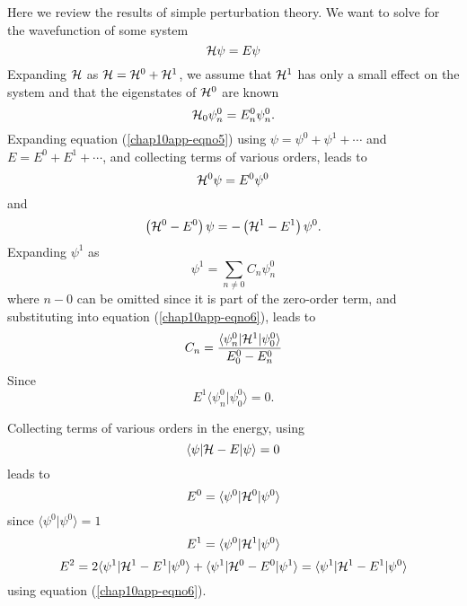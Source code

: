Here we review the results of simple perturbation theory.  We 
want to solve for the wavefunction of some system
\begin{equation}
{\cal H} \psi = E \psi
\label{chap10app-eqno5}
\end{equation}
Expanding ${\cal H}$ as ${\cal H} = {\cal H}^0 + {\cal H}^1$, 
we assume that ${\cal H}^1$ has only a small effect on the system and that the
eigenstates of ${\cal H}^0$ are known
\begin{equation}
{\cal H}_0 \psi^0_n = E^0_n \psi^0_n .
\end{equation}
Expanding equation (\ref{chap10app-eqno5}) using $\psi = \psi^0 +
\psi^1 + \cdots$ and $E = E^0 + E^1 + \cdots$, and collecting terms of
various orders, leads to
\begin{equation}
{\cal H}^0 \psi = E^0 \psi^0
\end{equation}
and
\begin{equation}
\left( {\cal H}^0 - E^0 \right) \psi = - \left( {\cal H}^1 - E^1 
\right) \psi^0.
\label{chap10app-eqno6}
\end{equation}
Expanding $\psi^1$ as
\begin{equation}
\psi^1 = \sum_{n \not= 0} C_n \psi^0_n
\end{equation}
where $n - 0$ can be omitted since it is part of the zero-order term, 
and substituting into equation (\ref{chap10app-eqno6}), leads to
\begin{equation}
C_n = {\langle \psi^0_n | {\cal H}^1 | \psi^0_0 \rangle \over E^0_0 - 
E^0_n}
\end{equation}
Since
\begin{equation}
E^1 \langle \psi^0_n | \psi^0_0 \rangle = 0 .
\end{equation}

Collecting terms of various orders in the energy, using
\begin{equation}
\langle \psi | {\cal H} - E | \psi \rangle = 0
\end{equation}
leads to
\begin{equation}
E^0 = \langle \psi^0 | {\cal H}^0 | \psi^0 \rangle
\end{equation}
since $\langle \psi^0 | \psi^0 \rangle = 1$
\begin{equation}
E^1 = \langle \psi^0 | {\cal H}^1 | \psi^0 \rangle
\end{equation}
\begin{equation}
E^2 = 2 \langle \psi^1 | {\cal H}^1 - E^1 | \psi^0 \rangle + 
\langle \psi^1 | {\cal H}^0 - E^0 | \psi^1 \rangle =
\langle \psi^1 | {\cal H}^1 - E^1 | \psi^0 \rangle
\end{equation}
using equation (\ref{chap10app-eqno6}).

